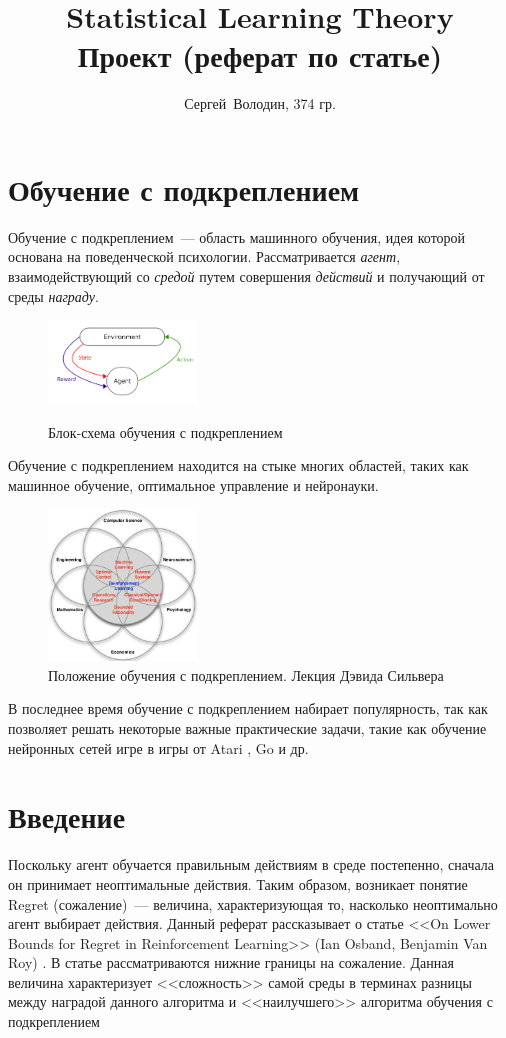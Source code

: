 \documentclass[a4paper]{article}
\title{Statistical Learning Theory\\Проект (реферат по статье)}
\date{}
\author{Сергей~Володин, 374 гр.}
\begin{document}
\maketitle
\section{Обучение с подкреплением}
Обучение с подкреплением~--- область машинного обучения, идея которой основана на поведенческой психологии. Рассматривается {\em агент}, взаимодействующий со {\em средой} путем совершения {\em действий} и получающий от среды {\em награду}.

\begin{figure}[h]
\caption{Блок-схема обучения с подкреплением}
\centering \includegraphics[width=150px]{RL.png}
\label{RL}
\end{figure}

Обучение с подкреплением находится на стыке многих областей, таких как машинное обучение, оптимальное управление и нейронауки.
\begin{figure}[h]
	\caption{Положение обучения с подкреплением. Лекция Дэвида Сильвера \cite{silver}}
	\centering \includegraphics[width=150px]{RL_position_DavidSilver.png}
\end{figure}

В последнее время обучение с подкреплением набирает популярность, так как позволяет решать некоторые важные практические задачи, такие как обучение нейронных сетей игре в игры от Atari \cite{dqn}, Go \cite{go} и др.

\section{Введение}
Поскольку агент обучается правильным действиям в среде постепенно, сначала он принимает неоптимальные действия. Таким образом, возникает понятие Regret (сожаление)~--- величина, характеризующая то, насколько неоптимально агент выбирает действия. Данный реферат рассказывает о статье <<On Lower Bounds for Regret in Reinforcement Learning>> (Ian Osband, Benjamin Van Roy) \cite{lower_bounds}. В статье рассматриваются нижние границы на сожаление. Данная величина характеризует <<сложность>> самой среды в терминах разницы между наградой данного алгоритма и <<наилучшего>> алгоритма обучения с подкреплением
\end{document}
